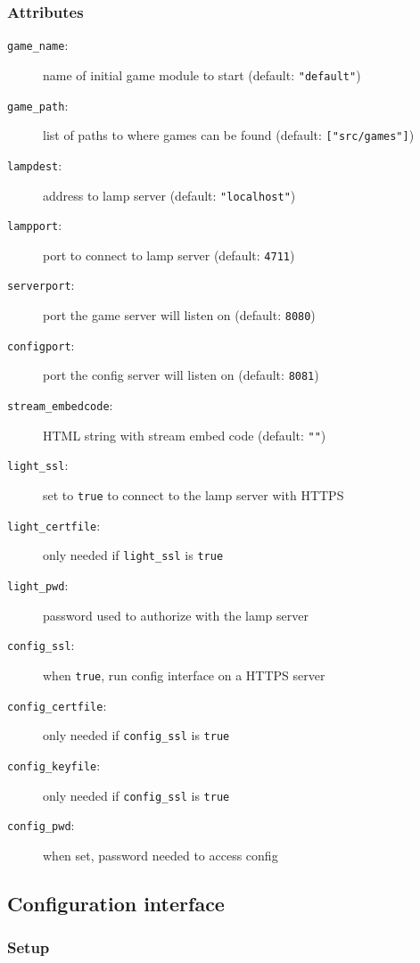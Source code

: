 \subsubsection{Attributes}
  \begin{description}
    \item[\texttt{game\_name}:] name of initial game module to start (default: \texttt{"default"})
    \item[\texttt{game\_path}:] list of paths to where games can be found (default: \texttt{["src/games"]})
    \item[\texttt{lampdest}:] address to lamp server (default: \texttt{"localhost"})
    \item[\texttt{lampport}:] port to connect to lamp server (default: \texttt{4711})
    \item[\texttt{serverport}:] port the game server will listen on (default: \texttt{8080})
    \item[\texttt{configport}:] port the config server will listen on (default: \texttt{8081})
    \item[\texttt{stream\_embedcode}:] HTML string with stream embed code (default: \texttt{""})
    \item[\texttt{light\_ssl}:] set to \texttt{true} to connect to the lamp server with HTTPS
    \item[\texttt{light\_certfile}:] only needed if \texttt{light\_ssl} is \texttt{true}
    \item[\texttt{light\_pwd}:] password used to authorize with the lamp server
    \item[\texttt{config\_ssl}:] when \texttt{true}, run config interface on a HTTPS server
    \item[\texttt{config\_certfile}:] only needed if \texttt{config\_ssl} is \texttt{true}
    \item[\texttt{config\_keyfile}:] only needed if \texttt{config\_ssl} is \texttt{true}
    \item[\texttt{config\_pwd}:] when set, password needed to access config
  \end{description}

\subsection{Configuration interface}
\subsubsection{Setup}

